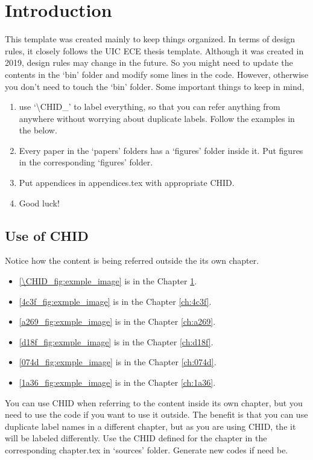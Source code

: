 \chapter{Introduction}\label{ch:\CHID}
This template was created mainly to keep things organized. In terms of design rules, it closely follows the UIC ECE thesis template. Although it was created in 2019, design rules may change in the future. So you might need to update the contents in the `bin' folder and modify some lines in the code. However, otherwise you don't need to touch the `bin' folder. Some important things to keep in mind,
\begin{enumerate}
	\item use `\textbackslash CHID\_' to label everything, so that you can refer anything from anywhere without worrying about duplicate labels. Follow the examples in the below.
	\item Every paper in the `papers' folders has a `figures' folder inside it. Put figures in the corresponding `figures' folder.
	\item Put appendices in appendices.tex with appropriate CHID.
	\item Good luck!
\end{enumerate}

\section{Use of CHID}
Notice how the content is being referred outside the its own chapter.
\begin{itemize}
	\item \ref{\CHID_fig:exmple_image} is in the Chapter \ref{ch:\CHID}.
	\item \ref{4c3f_fig:exmple_image} is in the Chapter \ref{ch:4c3f}.
	\item \ref{a269_fig:exmple_image} is in the Chapter \ref{ch:a269}.
	\item \ref{d18f_fig:exmple_image} is in the Chapter \ref{ch:d18f}.
	\item \ref{074d_fig:exmple_image} is in the Chapter \ref{ch:074d}.
	\item \ref{1a36_fig:exmple_image} is in the Chapter \ref{ch:1a36}.
\end{itemize}
You can use CHID when referring to the content inside its own chapter, but you need to use the code if you want to use it outside. The benefit is that you can use duplicate label names in a different chapter, but as you are using CHID, the it will be labeled differently.
Use the CHID defined for the chapter in the corresponding chapter.tex in `sources' folder.
Generate new codes if need be.

